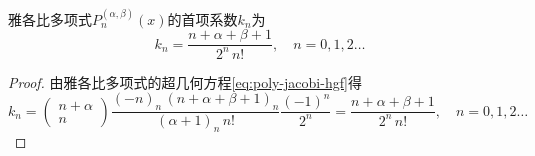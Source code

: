 \begin{subappendices}
\begin{theorem}[雅各比多项式的首项系数]
    雅各比多项式$P_n^{(\alpha,\beta)}(x)$的首项系数$k_n$为
    \begin{equation}
      \label{eq:poly-jacobi-leading-coeff-n}
      k_n = \frac{n+\alpha+\beta+1}{2^n \, n!}, \quad n=0,1,2 \ldots
    \end{equation}
\end{theorem}
\begin{proof}
  由雅各比多项式的超几何方程\eqref{eq:poly-jacobi-hgf}得
  \begin{equation*}
      k_n = \begin{pmatrix}
      n+\alpha \\ n
      \end{pmatrix}
      \frac{
      (-n)_n \, (n+\alpha+\beta+1)_n
      }{
      (\alpha+1)_n \, n!
      }
      \frac{
      (-1)^n
      }{
      2^n
      }
      =\frac{n+\alpha+\beta+1}{2^n \, n!}, \quad n=0,1,2 \ldots
  \end{equation*}
\end{proof}


\end{subappendices}
